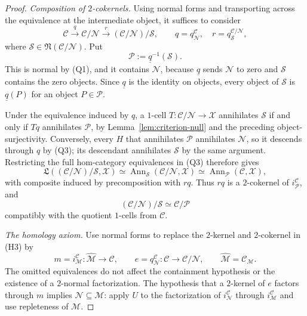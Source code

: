 \documentclass[11pt,reqno,a4paper]{amsart}
\theoremstyle{definition}
\theoremstyle{remark}
\newcommand{\C}{\mathcal{C}}
\newcommand{\M}{\mathcal{M}}
\newcommand{\N}{\mathcal{N}}
\newcommand{\0}{\mathbf{0}}
\renewcommand{\1}{\mathbf{1}}
\newcommand{\Lcat}{\mathfrak L}
\newcommand{\Pcal}{\mathcal P}
\newcommand{\Scl}{\mathcal S}
\newcommand{\X}{\mathcal X}
\DeclareMathOperator{\Ann}{Ann}
\begin{document}
\begin{proof}
\emph{Composition of $2$-cokernels.}
Using normal forms and transporting across the equivalence at
the intermediate object, it suffices to consider
\[
 \C\xrightarrow{q}\C/\N
 \xrightarrow{r}(\C/\N)/\Scl,
 \qquad
 q=q_{\N}^{\C},\quad r=q_{\Scl}^{\C/\N},
\]
where $\Scl\in\mathfrak{N}(\C/\N)$. Put
\begin{equation}\label{eq:Ppreimage}
 \Pcal:=\underline{q}^{-1}(\Scl).
\end{equation}
This is normal by (Q1), and it contains $\N$, because
$\underline{q}$ sends $\N$ to zero and $\Scl$ contains the
zero objects. Since $\underline{q}$ is the identity on objects,
every object of $\Scl$ is $\underline{q}(P)$ for an object
$P\in\Pcal$.

Under the equivalence induced by $q$, a $1$-cell
$T:\C/\N\to\X$ annihilates $\Scl$ if and only if $Tq$
annihilates $\Pcal$, by Lemma~\ref{lem:criterion-null} and
the preceding object-surjectivity. Conversely, every $H$ that
annihilates $\Pcal$ annihilates $\N$, so it descends through
$q$ by (Q3); its descendant annihilates $\Scl$ by the same
argument. Restricting the full hom-category equivalences in (Q3)
therefore gives
\[
 \Lcat((\C/\N)/\Scl,\X)
 \simeq \Ann_{\Scl}(\C/\N,\X)
 \simeq \Ann_{\Pcal}(\C,\X),
\]
with composite induced by precomposition with $rq$.
Thus $rq$ is a $2$-cokernel of $i_{\Pcal}^{\C}$, and
\begin{equation}\label{eq:iteratedgeneral}
 (\C/\N)/\Scl\simeq\C/\Pcal
\end{equation}
compatibly with the quotient $1$-cells from $\C$.

\emph{The homology axiom.}
Use normal forms to replace the $2$-kernel and $2$-cokernel
in (H3) by
\[
 m=i_{\M}^{\C}:\widehat{\M}\longrightarrow\C,
 \qquad
 e=q_{\N}^{\C}:\C\longrightarrow\C/\N,
 \qquad \widehat{\M}=\C_{\M}.
\]
The omitted equivalences do not affect the containment hypothesis
or the existence of a $2$-normal factorization.
The hypothesis that a $2$-kernel of $e$ factors through $m$
implies $\N\subseteq\M$: apply $U$ to the factorization of
$i_{\N}^{\C}$ through $i_{\M}^{\C}$ and use repleteness
of $\M$.


\end{proof}
\end{document}
